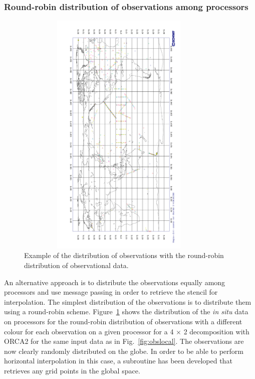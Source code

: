 \subsubsection{Round-robin distribution of observations among processors}

\begin{figure}     \begin{center}
\includegraphics[width=10cm,height=12cm,angle=-90.]{./TexFiles/Figures/Fig_ASM_obsdist_global}
\caption{      \label{fig:obsglobal}
Example of the distribution of observations with the round-robin distribution of observational data.}
\end{center}     \end{figure}

An alternative approach is to distribute the observations equally
among processors and use message passing in order to retrieve 
the stencil for interpolation. The simplest distribution of the observations 
is to distribute them using a round-robin scheme. Figure~\ref{fig:obsglobal}
shows the distribution of the {\em in situ} data on processors for the
round-robin distribution of observations with a different colour for
each observation on a given processor for a 4 $\times$ 2 decomposition 
with ORCA2 for the same input data as in Fig.~\ref{fig:obslocal}.
The observations are now clearly randomly distributed on the globe.
In order to be able to perform horizontal interpolation in this case, 
a subroutine has been developed that retrieves any grid points in the 
global space.

